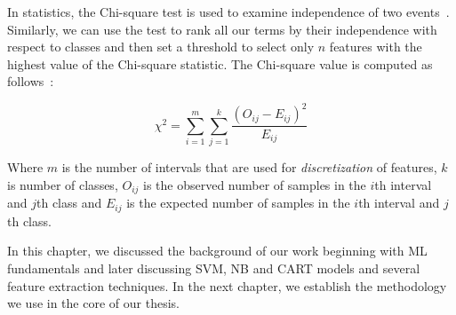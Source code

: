 In statistics, the Chi-square test is used to examine independence of two events~\cite{Alenezi2013}. Similarly, we can use the test to rank all our terms by their independence with respect to classes and then set a threshold to select only $n$ features with the highest value of the Chi-square statistic. The Chi-square value is computed as follows~\cite{Alenezi2013}:

$$\chi^2 = \sum_{i=1}^m \sum_{j=1}^k \frac{(O_{ij} - E_{ij})^2}{E_{ij}}$$

Where $m$ is the number of intervals that are used for \textit{discretization} of features, $k$ is number of classes, $O_{ij}$ is the observed number of samples in the $i$th interval and $j$th class and $E_{ij}$ is the expected number of samples in the $i$th interval and $j$th class.

In this chapter, we discussed the background of our work beginning with ML fundamentals and later discussing SVM, NB and CART models and several feature extraction techniques. In the next chapter, we establish the methodology we use in the core of our thesis.
